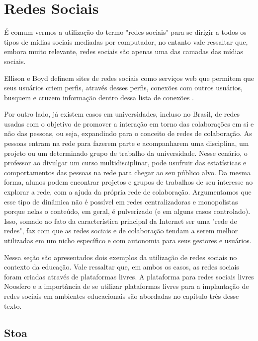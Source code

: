 \section{Redes Sociais}

É comum vermos a utilização do termo "redes sociais" para se dirigir a todos os
tipos de mídias sociais mediadas por computador, no entanto vale ressaltar que,
embora muito relevante, redes sociais são apenas uma das camadas das mídias sociais.

Ellison e Boyd definem sites de redes sociais como serviços web que permitem que
seus usuários criem perfis, através desses perfis, conexões com outros usuários,
busquem e cruzem informação dentro dessa lista de conexões \cite{beer2008}.

Por outro lado, já existem casos em universidades, incluso no Brasil, de redes 
usadas com o objetivo de promover a interação em torno das colaborações em si e
não das pessoas, ou seja, expandindo para o conceito de redes de colaboração. As
pessoas entram na rede para fazerem parte e acompanharem uma disciplina, um projeto
ou um determinado grupo de trabalho da universidade. Nesse cenário, o professor
ao divulgar um curso multidisciplinar, pode usufruir das estatísticas e
comportamentos das pessoas na rede para chegar ao seu público alvo. Da mesma
forma, alunos podem encontrar projetos e grupos de trabalhos de seu interesse ao
explorar a rede, com a ajuda da própria rede de colaboração. Argumentamos que
esse tipo de dinâmica não é possível em redes centralizadoras e monopolistas
porque nelas o conteúdo, em geral, é pulverizado (e em alguns casos controlado).
Isso, somado ao fato da característica principal da Internet ser uma "rede de redes",
faz com que as redes sociais e de colaboração tendam a serem melhor utilizadas
em um nicho específico e com autonomia para seus gestores e usuários.

Nessa seção são apresentados dois exemplos da utilização de redes sociais no
contexto da educação. Vale ressaltar que, em ambos os casos, as redes sociais
foram criadas através de plataformas livres. A plataforma para redes sociais
livres Noosfero e a importância de se utilizar plataformas livres para a
implantação de redes sociais em ambientes educacionais são abordadas no capítulo
três desse texto.

\subsection{Stoa}

